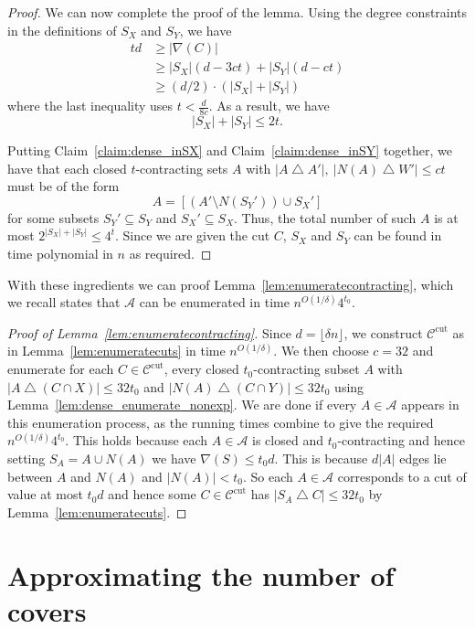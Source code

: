 \documentclass[11pt,letterpaper]{amsart}
\theoremstyle{definition}
\let\oldtriangle\triangle
\def\triangle{\mathbin{\oldtriangle}}
\newcommand*{\Ccut}{\mathcal{C}^{\mathrm{cut}}}
\begin{document}
\begin{proof}
We can now complete the proof of the lemma. Using the degree constraints in the definitions of $S_X$ and $S_Y$, we have 
\begin{align*}
td& \geq |\nabla(C)| \\
& \geq  |S_X|(d - 3ct) + |S_Y|(d - ct)
\\&\ge (d/2)\cdot(|S_X|+|S_Y|)
\end{align*}
where the last inequality uses $t < \frac{d}{8c}$. As a result, we have
\[
|S_X| + |S_Y| \le 2t.
\]

Putting Claim~\ref{claim:dense_inSX} and Claim~\ref{claim:dense_inSY} together, we have that each closed $t$-contracting sets $A$ with $|A \triangle A'|,~|N(A) \triangle W'| \leq ct$ must be of the form
\[
A = [(A'\setminus N(S_Y')) \cup S_X']
\]
for some subsets $S_Y' \subseteq S_Y$ and $S_X' \subseteq S_X$. Thus, the total number of such $A$ is at most $2^{|S_X|+|S_Y|} \le 4^{t}$.
Since we are given the cut $C$, $S_X$ and $S_Y$ can be found in time polynomial in $n$ as required.
\end{proof}

With these ingredients we can proof Lemma~\ref{lem:enumeratecontracting}, which we recall states that $\mathcal{A}$ can be enumerated in time $n^{O(1/\delta)} 4^{t_0}$.

\begin{proof}[Proof of Lemma~\ref{lem:enumeratecontracting}]
Since $d=\lfloor\delta n\rfloor$, we construct $\Ccut$ as in Lemma~\ref{lem:enumeratecuts} in time $n^{O(1/\delta)}$. 
We then choose $c=32$ and enumerate for each $C\in \Ccut$, every closed $t_0$-contracting subset $A$ with $|A \triangle (C \cap X)|\leq 32t_0$ and $|N(A) \triangle (C \cap Y)| \leq 32t_0$ using Lemma~\ref{lem:dense_enumerate_nonexp}. 
We are done if every $A\in\mathcal A$ appears in this enumeration process, as the running times combine to give the required $n^{O(1/\delta)} 4^{t_0}$.
This holds because each $A\in\mathcal A$ is closed and $t_0$-contracting and hence setting $S_A=A\cup N(A)$ we have $\nabla(S) \le t_0d$. This is because $d|A|$ edges lie between $A$ and $N(A)$ and $|N(A)|< t_0$. 
So each $A\in\mathcal A$ corresponds to a cut of value at most $t_0d$ 
and hence some $C\in\Ccut$ has $|S_A\triangle C|\le 32t_0$ by Lemma~\ref{lem:enumeratecuts}. 
\end{proof}





\section{Approximating the number of covers}\label{sec:approxDA}
\end{document}

